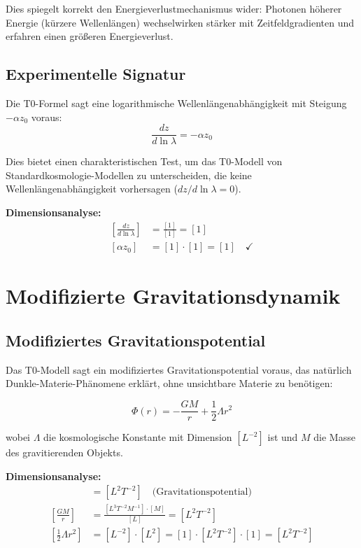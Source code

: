 \documentclass[12pt,a4paper]{report}
\begin{document}
	Dies spiegelt korrekt den Energieverlustmechanismus wider: Photonen höherer Energie (kürzere Wellenlängen) wechselwirken stärker mit Zeitfeldgradienten und erfahren einen größeren Energieverlust.
	
	\subsection{Experimentelle Signatur}
	\label{subsec:experimental_signature}
	
	Die T0-Formel sagt eine logarithmische Wellenlängenabhängigkeit mit Steigung $-\alpha z_0$ voraus:
	\begin{equation}
		\frac{dz}{d\ln\lambda} = -\alpha z_0
	\end{equation}
	
	Dies bietet einen charakteristischen Test, um das T0-Modell von Standardkosmologie-Modellen zu unterscheiden, die keine Wellenlängenabhängigkeit vorhersagen ($dz/d\ln\lambda = 0$).
	
	\textbf{Dimensionsanalyse:}
	\begin{align}
		\left[\frac{dz}{d\ln\lambda}\right] &= \frac{[1]}{[1]} = [1] \\
		[\alpha z_0] &= [1] \cdot [1] = [1] \quad \checkmark
	\end{align}
	
	\section{Modifizierte Gravitationsdynamik}
	\label{sec:modified_gravitational_dynamics}
	
\subsection{Modifiziertes Gravitationspotential}
\label{subsec:modified_potential}

Das T0-Modell sagt ein modifiziertes Gravitationspotential voraus, das natürlich Dunkle-Materie-Phänomene erklärt, ohne unsichtbare Materie zu benötigen:

\begin{equation}
	\Phi(r) = -\frac{GM}{r} + \frac{1}{2}\Lambda r^2
	\label{eq:modified_gravitational_potential}
\end{equation}

wobei $\Lambda$ die kosmologische Konstante mit Dimension $[L^{-2}]$ ist und $M$ die Masse des gravitierenden Objekts.

\textbf{Dimensionsanalyse:}
\begin{align}
	[\Phi(r)] &= [L^2 T^{-2}] \quad \text{(Gravitationspotential)} \\
	\left[\frac{GM}{r}\right] &= \frac{[L^3 T^{-2} M^{-1}] \cdot [M]}{[L]} = [L^2 T^{-2}] \\
	\left[\frac{1}{2}\Lambda r^2\right] &= [L^{-2}] \cdot [L^2] = [1] \cdot [L^2 T^{-2}] \cdot [1] = [L^2 T^{-2}]
\end{align}
\end{document}

